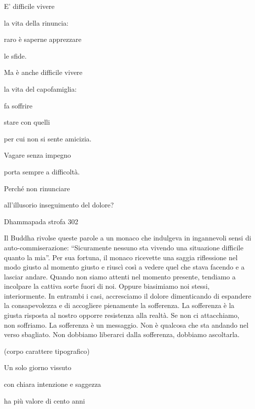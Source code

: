 \documentclass[a4paper,portrait,12pt]{article}
\begin{document}
\newpage



E' difficile vivere


la vita della rinuncia:


raro \`{e} saperne apprezzare 


le sfide.	


Ma \`{e} anche difficile vivere


la vita del capofamiglia:


fa soffrire


stare con quelli


per cui non si sente amicizia.


Vagare senza impegno


porta sempre a difficolt\`{a}.


Perch\'{e} non rinunciare


all'illusorio inseguimento del dolore?





Dhammapada strofa 302


\newpage



Il Buddha rivolse queste parole a un monaco che indulgeva in ingannevoli sensi di auto-commiserazione: ``Sicuramente nessuno sta vivendo una situazione difficile quanto la mia''. Per sua fortuna, il monaco ricevette una saggia riflessione nel modo giusto al momento giusto e riuscì così a vedere quel che stava facendo e a lasciar andare. Quando non siamo attenti nel momento presente, tendiamo a incolpare la cattiva sorte fuori di noi. Oppure biasimiamo noi stessi, interiormente.  In entrambi i casi, accresciamo il dolore dimenticando di espandere la consapevolezza e di accogliere pienamente la sofferenza. La sofferenza \`{e} la giusta risposta al nostro opporre resistenza alla realt\`{a}. Se non ci attacchiamo, non soffriamo. La sofferenza \`{e} un messaggio. Non \`{e} qualcosa che sta andando nel verso sbagliato. Non dobbiamo liberarci dalla sofferenza, dobbiamo ascoltarla. 








(corpo carattere tipografico)


\newpage



Un solo giorno vissuto


con chiara intenzione e saggezza


ha più valore di cento anni
\end{document}
